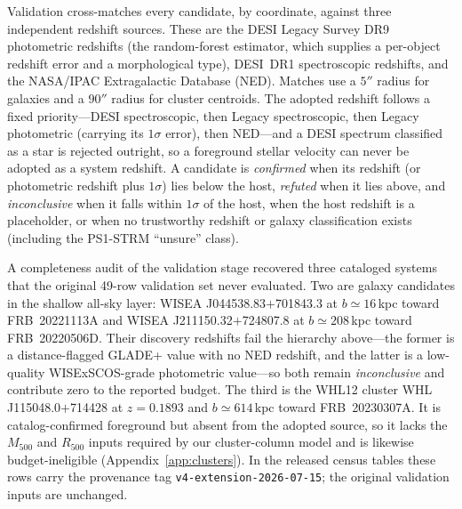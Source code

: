 Validation cross-matches every candidate, by coordinate, against three
independent redshift sources. These are the DESI Legacy Survey DR9 photometric
redshifts (the \citealt{Zhou2021} random-forest estimator, which supplies a
per-object redshift error and a morphological type), DESI~DR1 spectroscopic
redshifts, and the NASA/IPAC Extragalactic Database (NED). Matches use a $5''$ radius for
galaxies and a $90''$ radius for cluster centroids. The adopted redshift follows
a fixed priority---DESI spectroscopic, then Legacy spectroscopic, then Legacy
photometric (carrying its $1\sigma$ error), then NED---and a DESI spectrum
classified as a star is rejected outright, so a foreground stellar velocity can
never be adopted as a system redshift. A candidate is \emph{confirmed} when its
redshift (or photometric redshift plus $1\sigma$) lies below the host,
\emph{refuted} when it lies above, and \emph{inconclusive} when it falls within
$1\sigma$ of the host, when the host redshift is a placeholder, or when no
trustworthy redshift or galaxy classification exists (including the
PS1-STRM ``unsure'' class).

A completeness audit of the validation stage recovered three cataloged
systems that the original 49-row validation set never evaluated. Two are
galaxy candidates in the shallow all-sky layer: WISEA
J044538.83$+$701843.3 at $b\simeq16$\,kpc toward FRB~20221113A and WISEA
J211150.32$+$724807.8 at $b\simeq208$\,kpc toward FRB~20220506D. Their
discovery redshifts fail the hierarchy above---the former is a
distance-flagged GLADE+ value with no NED redshift, and the latter is a
low-quality WISExSCOS-grade photometric value---so both remain
\emph{inconclusive} and contribute zero to the reported budget. The third is
the WHL12 cluster WHL J115048.0$+$714428 at $z=0.1893$ and
$b\simeq614$\,kpc toward FRB~20230307A. It is catalog-confirmed foreground but
absent from the adopted \citet{WenHan2024} source, so it lacks the $M_{500}$
and $R_{500}$ inputs required by our cluster-column model and is likewise
budget-ineligible (Appendix~\ref{app:clusters}). In the released census
tables these rows carry the provenance tag \texttt{v4-extension-2026-07-15};
the original validation inputs are unchanged.

